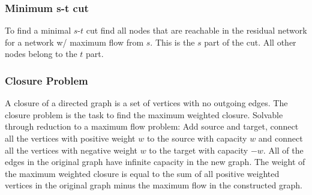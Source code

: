 
\subsubsection{Minimum s-t cut}

To find a minimal $s$-$t$ cut find all nodes that are reachable in the
residual network for a network w/ maximum flow from $s$.  This is the
$s$ part of the cut.  All other nodes belong to the $t$ part.

\subsubsection{Closure Problem}

A closure of a directed graph is a set of vertices with no outgoing
edges.  The closure problem is the task to find the maximum weighted
closure.  Solvable through reduction to a maximum flow problem: Add
source and target, connect all the vertices with positive weight $w$
to the source with capacity $w$ and connect all the vertices with
negative weight $w$ to the target with capacity $-w$.  All of the
edges in the original graph have infinite capacity in the new
graph.  The weight of the maximum weighted closure is equal to the sum
of all positive weighted vertices in the original graph minus the
maximum flow in the constructed graph.

